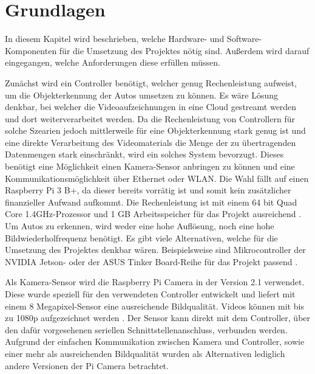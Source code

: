 \section{Grundlagen}\label{ch:Grundlagen}
In diesem Kapitel wird beschrieben, welche Hardware- und Software-Komponenten für die Umsetzung des Projektes nötig sind.
Außerdem wird darauf eingegangen, welche Anforderungen diese erfüllen müssen.

Zunächst wird ein Controller benötigt, welcher genug Rechenleistung aufweist, um die Objekterkennung der Autos umsetzen zu können.
Es wäre Lösung denkbar, bei welcher die Videoaufzeichnungen in eine Cloud gestreamt werden und dort weiterverarbeitet werden. 
Da die Rechenleistung von Controllern für solche Szearien jedoch mittlerweile für eine Objekterkennung stark genug ist und eine direkte Verarbeitung des Videomaterials die Menge der zu übertragenden Datenmengen stark einschränkt, wird ein solches System bevorzugt. 
Dieses benötigt eine Möglichkeit einen Kamera-Sensor anbringen zu können und eine Kommunikationsmöglichkeit über Ethernet oder WLAN.
Die Wahl fällt auf einen Raspberry Pi 3 B+, da dieser bereits vorrätig ist und somit kein zusätzlicher finanzieller Aufwand aufkommt.
Die Rechenleistung ist mit einem 64 bit Quad Core 1.4GHz-Prozessor und 1 GB Arbeitsspeicher für das Projekt ausreichend \cite{pi3}.
Um Autos zu erkennen, wird weder eine hohe Auflösung, noch eine hohe Bildwiederholfrequenz benötigt. 
Es gibt viele Alternativen, welche für die Umsetzung des Projektes denkbar wären.
Beispielsweise sind Mikrocontroller der NVIDIA Jetson- oder der ASUS Tinker Board-Reihe für das Projekt passend \cite{jetson} \cite{tinkerBoard}.

Als Kamera-Sensor wird die Raspberry Pi Camera in der Version 2.1 verwendet. 
Diese wurde speziell für den verwendeten Controller entwickelt und liefert mit einem 8 Megapixel-Sensor eine ausreichende Bildqualität.
Videos können mit bis zu 1080p aufgezeichnet werden \cite{piCAM}.
Der Sensor kann direkt mit dem Controller, über den dafür vorgesehenen seriellen Schnittstellenanschluss, verbunden werden.
Aufgrund der einfachen Kommunikation zwischen Kamera und Controller, sowie einer mehr als ausreichenden Bildqualität wurden als Alternativen lediglich andere Versionen der Pi Camera betrachtet. 

